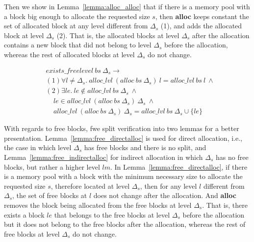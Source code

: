 Then we show in Lemma~\ref{lemma:alloc_alloc} that if there is a memory pool with a block big enough to allocate the requested size $s$, then \textbf{alloc} keeps constant the set of allocated block at any level different from $\Delta_s$ (1), and adds the allocated block at level $\Delta_s$ (2). That is, the allocated blocks at level $\Delta_s$ after the allocation contains a new block that did not belong to level $\Delta_s$ before the allocation, whereas the rest of allocated blocks at level $\Delta_s$ do not change.

\begin{lemma} 
\label{lemma:alloc_alloc}
\begin{align*}
&exists\_freelevel\ bs\  \Delta_s \longrightarrow \\
&(1)\forall l \ne \Delta_s.\ alloc\_lvl\ (alloc\ bs\ \Delta_s)\ l = alloc\_lvl\ bs\ l\ \wedge\\
&(2)\exists le.\ le \notin alloc\_lvl\ bs\ \Delta_s\ \wedge\\
&\ \ \ \ \ le \in alloc\_lvl\ (alloc\ bs\ \Delta_s)\ \Delta_s\ \wedge\\
&\ \ \ \ \ alloc\_lvl\ (alloc\ bs\ \Delta_s)\ \Delta_s = alloc\_lvl\ bs\ \Delta_s \cup \lbrace le \rbrace
\end{align*}
\end{lemma}

With regards to free blocks, fwe split verification into two lemmas for a better presentation. Lemma~\ref{lemma:free_directalloc} is used for direct allocation, i.e., the case in which level $\Delta_s$ has free blocks and there is no split, and Lemma~\ref{lemma:free_indirectalloc} for indirect allocation in which $\Delta_s$ has no free blocks, but rather a higher level $lm$. In Lemma~\ref{lemma:free_directalloc}, if there is a memory pool with a block with the minimum necessary size to allocate the requested size $s$, therefore located at level $\Delta_s$, then for any level $l$ different from $\Delta_s$, the set of free blocks at $l$ does not change after the allocation. And \textbf{alloc} removes the block being allocated from the free blocks at level $\Delta_s$. That is, there exists a block $le$ that belongs to the free blocks at level $\Delta_s$ before the allocation but it does not belong to the free blocks after the allocation, whereas the rest of free blocks at level $\Delta_s$ do not change.

